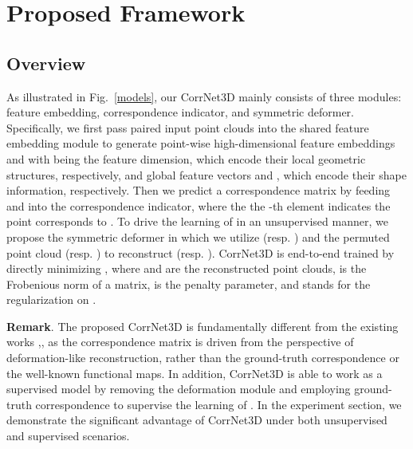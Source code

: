 \documentclass[final]{cvpr}
\begin{document}
\section{Proposed Framework}

\subsection{Overview}


As illustrated in Fig.~\ref{models}, 
our CorrNet3D mainly consists of three modules: feature embedding, correspondence indicator, and  symmetric deformer. Specifically,
we first pass paired input point clouds into the shared feature embedding module to generate point-wise high-dimensional feature embeddings
 and  with  being the feature dimension,  which encode their local geometric structures, respectively,  and global feature vectors  and , which encode their shape information, respectively. Then we predict a correspondence matrix  by feeding  and  into the correspondence indicator, where the the -th element  indicates the point  corresponds to . 
To drive the learning of  in an unsupervised manner, we propose the symmetric deformer  in which we utilize  (resp.  ) and the permuted point cloud  (resp. ) to reconstruct  (resp. ).
CorrNet3D is end-to-end trained by directly minimizing , where  and  are the reconstructed point clouds,  is the Frobenious norm of a matrix,  is the penalty parameter, and  stands for the regularization on . 


\textbf{Remark}. The proposed CorrNet3D is fundamentally different from the existing works \cite{yew2020rpm},\cite{donati2020deep}, as the correspondence matrix is driven from the perspective of deformation-like reconstruction, rather than the ground-truth correspondence or the well-known functional maps. In addition, CorrNet3D is able to work as a supervised model by removing the deformation module and employing ground-truth correspondence to supervise the learning of .  In the experiment section, we demonstrate the significant advantage of CorrNet3D under both unsupervised and supervised scenarios. 
\end{document}
